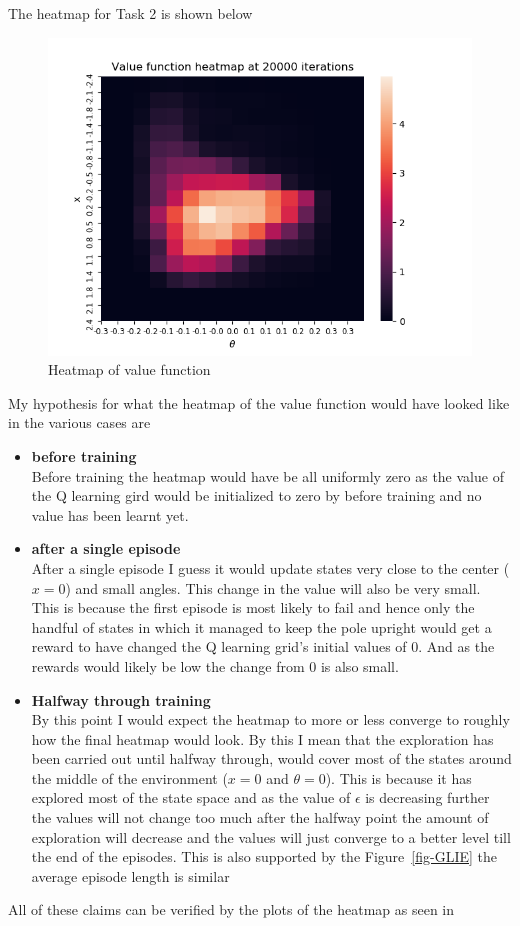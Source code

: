 \documentclass[a4paper]{article}
\begin{document}
The heatmap for Task 2 is shown below
\begin{figure}[h!]
    \centering
    \includegraphics[width=\textwidth]{heatmap_done.png}
    \caption{Heatmap of value function}
    \label{fig-heatmap-done}
\end{figure}

\noindent
My hypothesis for what the heatmap of the value function would have looked like in the various cases are
\begin{itemize}
    \item \textbf{before training} \\ 
    Before training the heatmap would have be all uniformly zero as the value of the Q learning gird would be initialized to zero by before training and no value has been learnt yet.
    \item \textbf{after a single episode}\\
    After a single episode I guess it would update states very close to the center ($x=0$) and small angles. This change in the value will also be very small. This is because the first episode is most likely to fail and hence only the handful of states in which it managed to keep the pole upright would get a reward to have changed the Q learning grid's initial values of 0. And as the rewards would likely be low the change from 0 is also small.
    \item \textbf{Halfway through training}\\
    By this point I would expect the heatmap to more or less converge to roughly how the final heatmap would look. By this I mean that the exploration has been carried out until halfway through, would cover most of the states around the middle of the environment ($x=0$ and $\theta =0$). This is because it has explored most of the state space and as the value of $\epsilon$ is decreasing further the values will not change too much after the halfway point the amount of exploration will decrease and the values will just converge to a better level till the end of the episodes. This is also supported by the Figure~\ref{fig-GLIE} the average episode length is similar 
\end{itemize}
All of these claims can be verified by the plots of the heatmap as seen in 
\end{document}
